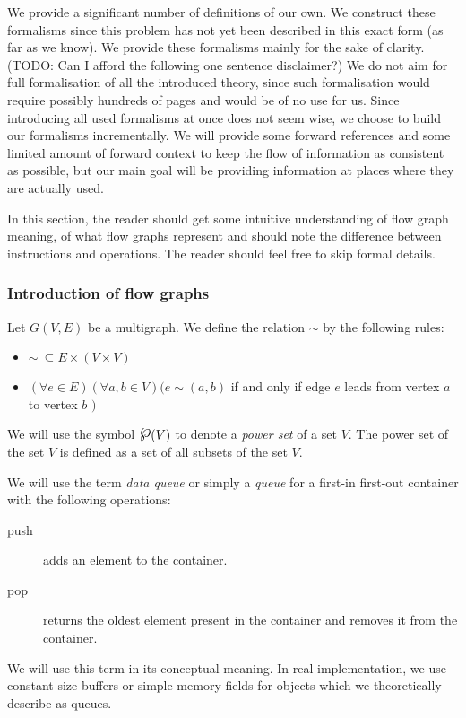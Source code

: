 

We provide a significant number of definitions of our own. We construct these formalisms since this problem has not yet been described in this exact form (as far as we know).  We provide these formalisms mainly for the sake of clarity. (TODO: Can I afford the following one sentence disclaimer?) We do not aim for full formalisation of all the introduced theory, since such formalisation would require possibly hundreds of pages and would be of no use for us. Since introducing all used formalisms at once does not seem wise, we choose to build our formalisms incrementally. We will provide some forward references and some limited amount of forward context to keep the flow of information as consistent as possible, but our main goal will be providing information at places where they are actually used.


In this section, the reader should get some intuitive understanding of flow graph meaning, of what flow graphs represent and should note the difference between instructions and operations. The reader should feel free to skip formal details.

\subsubsection{Introduction of flow graphs}

  Let $G(V,E)$ be a multigraph. We define the relation $\sim$ by the following rules:
  \begin{itemize}
  \item $\sim \ \subseteq E \times (V \times V)$ 
  \item $ (\forall e \in E)(\forall a,b \in V)( e \sim (a,b) $ if and only if edge $e$ leads from vertex $a$ to vertex $b$ $)$
  \end{itemize}
\myenddef


  We will use the symbol $\powerset(V)$ to denote a \emph{power set} of a set $V$. The power set of the set $V$ is defined as a set of all subsets of the set $V$.
\myenddef


  We will use the term \emph{data queue} or simply a \emph{queue} for a first-in first-out container with the following operations:
  \begin{description}
  \item[push] adds an element to the container.
  \item[pop] returns the oldest element present in the container and removes it from the container.
  \end{description}
  We will use this term in its conceptual meaning. In real implementation, we use constant-size buffers or simple memory fields for objects which we theoretically describe as queues.
\myenddef


